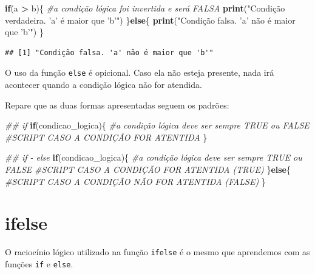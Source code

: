 \documentclass[
]{book}
\newenvironment{Shaded}{\begin{snugshade}}{\end{snugshade}}
\newcommand{\CommentTok}[1]{\textcolor[rgb]{0.56,0.35,0.01}{\textit{#1}}}
\newcommand{\ControlFlowTok}[1]{\textcolor[rgb]{0.13,0.29,0.53}{\textbf{#1}}}
\newcommand{\KeywordTok}[1]{\textcolor[rgb]{0.13,0.29,0.53}{\textbf{#1}}}
\newcommand{\NormalTok}[1]{#1}
\newcommand{\OperatorTok}[1]{\textcolor[rgb]{0.81,0.36,0.00}{\textbf{#1}}}
\newcommand{\StringTok}[1]{\textcolor[rgb]{0.31,0.60,0.02}{#1}}
\begin{document}
\begin{Shaded}
\begin{Highlighting}[]
\ControlFlowTok{if}\NormalTok{(a }\OperatorTok{>}\StringTok{ }\NormalTok{b)\{ }\CommentTok{#a condição lógica foi invertida e será FALSA}
    \KeywordTok{print}\NormalTok{(}\StringTok{"Condição verdadeira. 'a' é maior que 'b'"}\NormalTok{)}
\NormalTok{\}}\ControlFlowTok{else}\NormalTok{\{}
      \KeywordTok{print}\NormalTok{(}\StringTok{"Condição falsa. 'a' não é maior que 'b'"}\NormalTok{)}
\NormalTok{\}}
\end{Highlighting}
\end{Shaded}

\begin{verbatim}
## [1] "Condição falsa. 'a' não é maior que 'b'"
\end{verbatim}

O uso da função \texttt{else} é opicional. Caso ela não esteja presente,
nada irá acontecer quando a condição lógica não for atendida.

Repare que as duas formas apresentadas seguem os padrões:

\begin{Shaded}
\begin{Highlighting}[]
\CommentTok{## if}
\ControlFlowTok{if}\NormalTok{(condicao_logica)\{ }\CommentTok{#a condição lógica deve ser sempre TRUE ou FALSE}
  \CommentTok{#SCRIPT CASO A CONDIÇÃO FOR ATENTIDA}
\NormalTok{\}}
\end{Highlighting}
\end{Shaded}

\begin{Shaded}
\begin{Highlighting}[]
\CommentTok{## if - else}
\ControlFlowTok{if}\NormalTok{(condicao_logica)\{ }\CommentTok{#a condição lógica deve ser sempre TRUE ou FALSE}
  \CommentTok{#SCRIPT CASO A CONDIÇÃO FOR ATENTIDA (TRUE)}
\NormalTok{\}}\ControlFlowTok{else}\NormalTok{\{}
    \CommentTok{#SCRIPT CASO A CONDIÇÃO NÃO FOR ATENTIDA (FALSE)}
\NormalTok{\}}
\end{Highlighting}
\end{Shaded}

\hypertarget{ifelse}{%
\section{ifelse}\label{ifelse}}

O raciocínio lógico utilizado na função \texttt{ifelse} é o mesmo que
aprendemos com as funções \texttt{if} e \texttt{else}.
\end{document}
